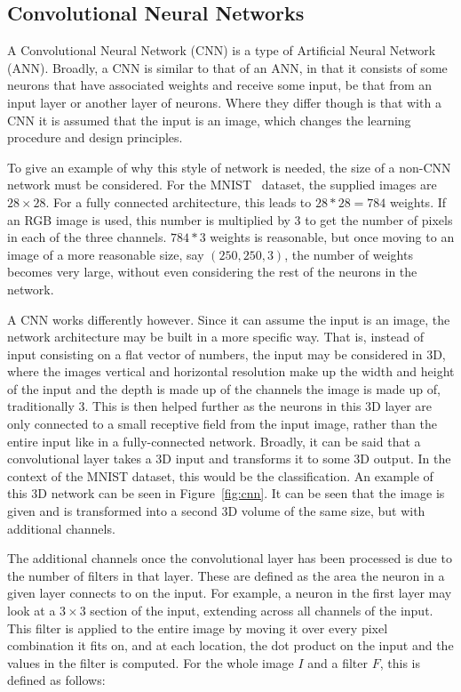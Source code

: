 \subsection{Convolutional Neural Networks}

A Convolutional Neural Network (CNN) is a type of Artificial Neural Network
(ANN). Broadly, a CNN is similar to that of an ANN, in that it consists of some
neurons that have associated weights and receive some input, be that
from an input layer or another layer of neurons. Where they differ though is
that with a CNN it is assumed that the input is an image, which changes the
learning procedure and design principles.

To give an example of why this style of network is needed, the size of a non-CNN
network must be considered. For the MNIST~\cite{lecun2010mnist} dataset, the
supplied images are $28 \times 28$. For a fully connected architecture, this
leads to $28 * 28 = 784$ weights. If an RGB image is used, this number is
multiplied by 3 to get the number of pixels in each of the three channels. $784 * 3$
weights is reasonable, but once moving to an image of a more reasonable size,
say $(250, 250, 3)$, the number of weights becomes very large, without even
considering the rest of the neurons in the network.

A CNN works differently however. Since it can assume the input is an
image, the network architecture may be built in a more specific way. That is,
instead of input consisting on a flat vector of numbers, the input may be
considered in 3D, where the images vertical and horizontal resolution make up
the width and height of the input and the depth is made up of the channels the
image is made up of, traditionally 3. This is then helped further as the
neurons in this 3D layer are only connected to a small receptive field from the
input image, rather than the entire input like in a fully-connected network.
Broadly, it can be said that a convolutional layer takes a 3D input and
transforms it to some 3D output. In the context of the MNIST dataset, this
would be the classification. An example of this 3D network can be seen in
Figure~\ref{fig:cnn}. It can be seen that the image is given and is transformed
into a second 3D volume of the same size, but with additional channels.

The additional channels once the convolutional layer has been processed is due
to the number of filters in that layer. These are defined as the area the
neuron in a given layer connects to on the input. For example, a neuron in the
first layer may look at a $3 \times 3$ section of the input, extending across
all channels of the input. This filter is applied to the entire image by moving
it over every pixel combination it fits on, and at each location, the dot product
on the input and the values in the filter is computed. For the whole image $I$
and a filter $F$, this is defined as follows:

